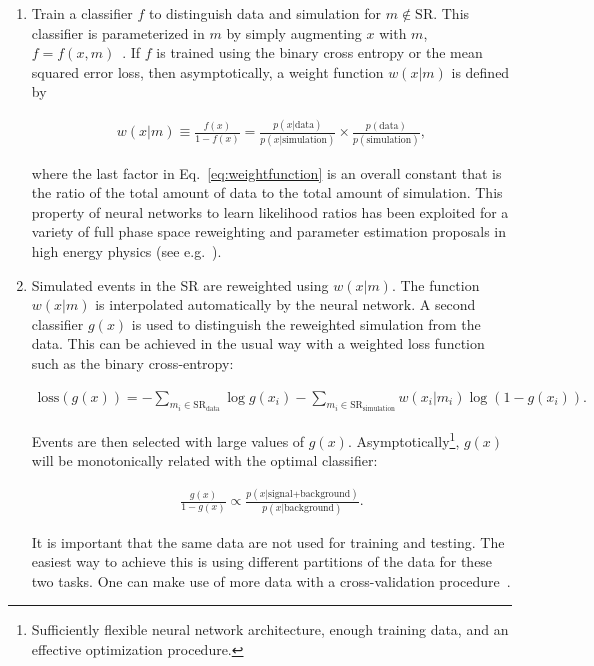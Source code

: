 \documentclass[a4paper,11pt]{article}
\begin{document}
\begin{enumerate}
\item Train a classifier $f$ to distinguish data and simulation for $m\not\in\text{SR}$.  This classifier is parameterized in $m$ by simply augmenting $x$ with $m$, $f=f(x,m)$~\cite{Cranmer:2015bka,Baldi:2016fzo}.  If $f$ is trained using the binary cross entropy or the mean squared error loss, then asymptotically, a weight function $w(x|m)$ is defined by 

\begin{align}
\label{eq:weightfunction}
w(x|m)\equiv \frac{f(x)}{1-f(x)} = \frac{p(x|\text{data})}{p(x|\text{simulation})}\times\frac{p(\text{data})}{p(\text{simulation})},
\end{align}

\noindent where the last factor in Eq.~\ref{eq:weightfunction} is an overall constant that is the ratio of the total amount of data to the total amount of simulation.  This property of neural networks to learn likelihood ratios has been exploited for a variety of full phase space reweighting and parameter estimation proposals in high energy physics (see e.g.~\cite{Andreassen:2019nnm,Brehmer:2018hga,Brehmer:2018eca,Brehmer:2018kdj,Cranmer:2015bka,Andreassen:2019cjw}).

\item Simulated events in the SR are reweighted using $w(x|m)$.  The function $w(x|m)$ is interpolated automatically by the neural network.  A second classifier $g(x)$ is used to distinguish the reweighted simulation from the data.  This can be achieved in the usual way with a weighted loss function such as the binary cross-entropy:

\begin{align}
\text{loss}(g(x))=-\sum_{m_i\in\text{SR}_\text{data}} \log g(x_i)-\sum_{m_i\in\text{SR}_\text{simulation}} w(x_i|m_i)\log (1-g(x_i)).
\end{align}

\noindent Events are then selected with large values of $g(x)$.  Asymptotically\footnote{Sufficiently flexible neural network architecture, enough training data, and an effective optimization procedure.}, $g(x)$ will be monotonically related with the optimal classifier:

\begin{align}
\frac{g(x)}{1-g(x)}\propto \frac{p(x|\text{signal+background})}{p(x|\text{background})}.
\end{align}

\noindent It is important that the same data are not used for training and testing.  The easiest way to achieve this is using different partitions of the data for these two tasks.  One can make use of more data with a cross-validation procedure~\cite{Collins:2018epr,Collins:2019jip}.


\end{enumerate}
\end{document}
